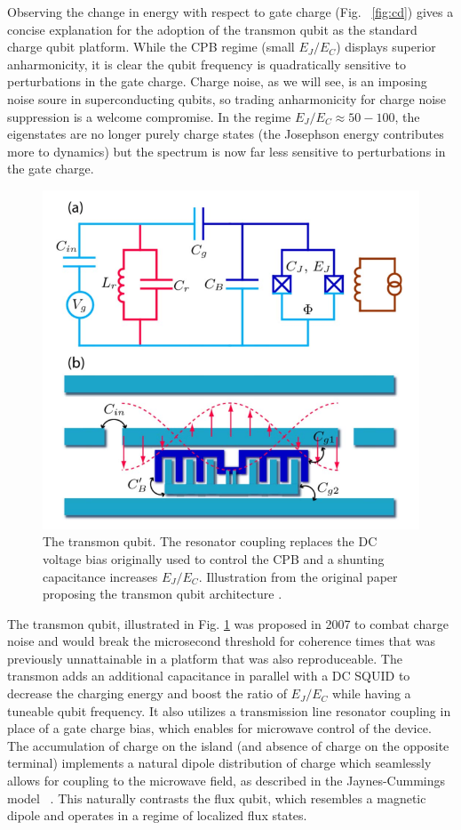 \documentclass[%
 reprint,
showpacs,
 amsmath,amssymb,
 aps,
longbibliography,
]{revtex4-1}
\begin{document}
Observing the change in energy with respect to gate charge (Fig. \ \ref{fig:cd}) gives a concise explanation for the adoption of the transmon qubit as the standard charge qubit platform. While the CPB regime (small $E_J/E_C$) displays superior anharmonicity, it is clear the qubit frequency is quadratically sensitive to perturbations in the gate charge. Charge noise, as we will see, is an imposing noise soure in superconducting qubits, so trading anharmonicity for charge noise suppression is a welcome compromise. In the regime $E_J/E_C \approx 50-100$, the eigenstates are no longer purely charge states (the Josephson energy contributes more to dynamics) but the spectrum is now far less sensitive to perturbations in the gate charge. 
\begin{figure}[h!]
  \includegraphics[width=\linewidth]{transmonfig.png}
  \caption{The transmon qubit. The resonator coupling replaces the DC voltage bias originally used to control the CPB and a shunting capacitance increases $E_J/E_C$. Illustration from the original paper proposing the transmon qubit architecture \cite{Transmon}.}
  \label{fig:transmon}
\end{figure}

The transmon qubit, illustrated in Fig. \ref{fig:transmon} was proposed in 2007 \cite{Transmon} to combat charge noise and would break the microsecond threshold for coherence times that was previously unnattainable in a platform that was also reproduceable. The transmon adds an additional capacitance in parallel with a DC SQUID \cite{squid} to decrease the charging energy and boost the ratio of $E_J/E_C$ while having a tuneable qubit frequency. It also utilizes a transmission line resonator coupling in place of a gate charge bias, which enables for microwave control of the device. The accumulation of charge on the island (and absence of charge on the opposite terminal) implements a natural dipole distribution of charge which seamlessly allows for coupling to the microwave field, as described in the Jaynes-Cummings model \ \cite{jaynescummings}. This naturally contrasts the flux qubit, which resembles a magnetic dipole and operates in a regime of localized flux states.
\end{document}
